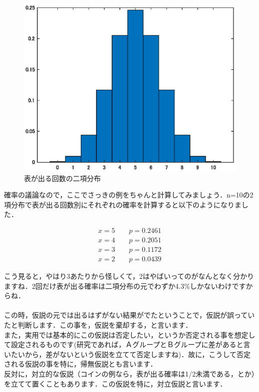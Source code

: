 \documentclass[11pt,a4paper,uplatex]{ujreport} 	%
\begin{document}
\begin{figure}[H]
  \label{im:bino}
    \centering
    \includegraphics[width=120mm]{../figures/bino.eps}
    \caption{表が出る回数の二項分布}
\end{figure}

確率の議論なので，ここでさっきの例をちゃんと計算してみましょう．n=10の2項分布で表が出る回数別にそれぞれの確率を計算すると以下のようになりました．

\begin{align}
  x=5 \qquad p = 0.2461 \nonumber \\
  x=4 \qquad p = 0.2051 \nonumber \\
  x=3 \qquad p = 0.1172 \nonumber\\
  x=2 \qquad p = 0.0439 \nonumber
\end{align}

こう見ると，やはり3あたりから怪しくて，2はやばいってのがなんとなく分かりますね．2回だけ表が出る確率は二項分布の元でわずか4.3\%しかないわけですからね．\\
\\

この時，仮説の元では出るはずがない結果がでたということで，仮説が誤っていたと判断します．この事を，仮説を棄却する，と言います．\\

また，実用では基本的にこの仮説は否定したい，というか否定される事を想定して設定されるものです(研究であれば，ＡグループとＢグループに差があると言いたいから，差がないという仮説を立てて否定しますね)．故に，こうして否定される仮説の事を特に，帰無仮説とも言います．\\

反対に，対立的な仮説（コインの例なら，表が出る確率は1/2未満である，とか）を立てて置くこともあります．この仮説を特に，対立仮説と言います．\\
\end{document}
